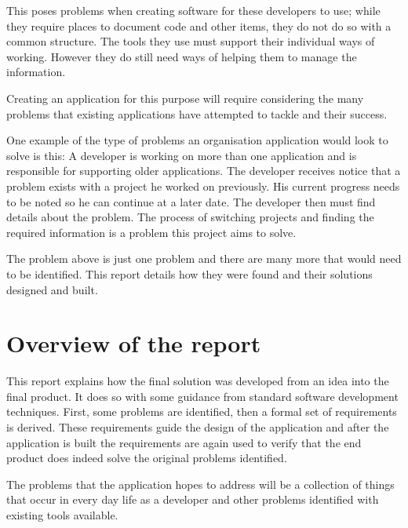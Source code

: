This poses problems when creating software for these developers to use; while
they require places to document code and other items, they do not do so with a
common structure. The tools they use must support their individual ways of
working. However they do still need ways of helping them to manage the
information.

Creating an application for this purpose will require considering the many
problems that existing applications have attempted to tackle and their success.

One example of the type of problems an organisation application would look to
solve is this: A developer is working on more than one application and is
responsible for supporting older applications. The developer receives notice
that a problem exists with a project he worked on previously. His current
progress needs to be noted so he can continue at a later date. The developer
then must find details about the problem. The process of switching projects and
finding the required information is a problem this project aims to solve.

The problem above is just one problem and there are many more that would need to
be identified. This report details how they were found and their solutions
designed and built.

\section{Overview of the report}\label{overview-of-the-report}

This report explains how the final solution was developed from an idea
into the final product. It does so with some guidance from standard
software development techniques. First, some problems are identified, then
a formal set of requirements is derived. These requirements guide the
design of the application and after the application is built the
requirements are again used to verify that the end product does indeed
solve the original problems identified.

The problems that the application hopes to address will be a collection
of things that occur in every day life as a developer and other problems
identified with existing tools available.
